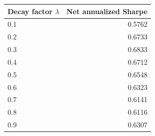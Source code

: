 \begin{tabular}{lr}
\toprule
Decay factor $\lambda$ & Net annualized Sharpe \\
\midrule
0.1 & 0.5762 \\
0.2 & 0.6733 \\
0.3 & 0.6833 \\
0.4 & 0.6712 \\
0.5 & 0.6548 \\
0.6 & 0.6323 \\
0.7 & 0.6141 \\
0.8 & 0.6116 \\
0.9 & 0.6307 \\
\bottomrule
\end{tabular}
